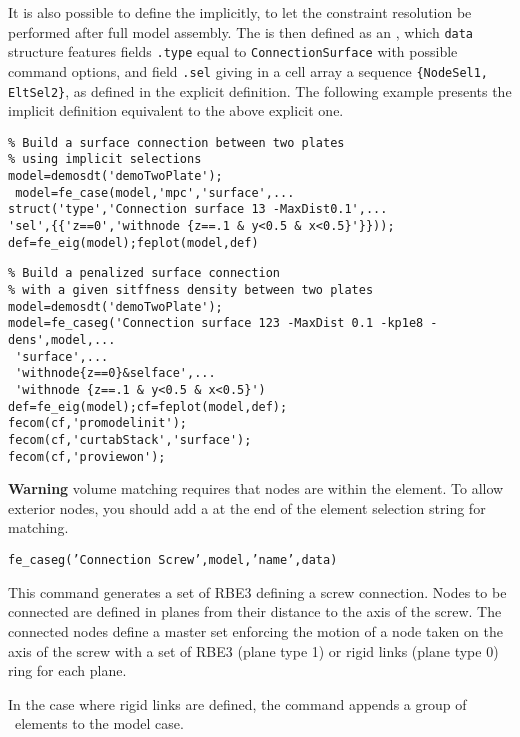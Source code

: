 \begin{SDT}
It is also possible to define the  implicitly, to let the constraint resolution be performed after full model assembly. The  is then defined as an , which {\tt data} structure features fields {\tt .type} equal to {\tt ConnectionSurface} with possible command options, and field {\tt .sel} giving in a cell array a sequence {\tt \{NodeSel1, EltSel2\}}, as defined in the explicit definition. The following example presents the implicit  definition equivalent to the above explicit one.

\begin{verbatim}
% Build a surface connection between two plates
% using implicit selections
model=demosdt('demoTwoPlate');
 model=fe_case(model,'mpc','surface',...
struct('type','Connection surface 13 -MaxDist0.1',...
'sel',{{'z==0','withnode {z==.1 & y<0.5 & x<0.5}'}}));
def=fe_eig(model);feplot(model,def)
\end{verbatim}%

\begin{verbatim}
% Build a penalized surface connection 
% with a given sitffness density between two plates
model=demosdt('demoTwoPlate');
model=fe_caseg('Connection surface 123 -MaxDist 0.1 -kp1e8 -dens',model,...
 'surface',...
 'withnode{z==0}&selface',...
 'withnode {z==.1 & y<0.5 & x<0.5}')
def=fe_eig(model);cf=feplot(model,def);
fecom(cf,'promodelinit');
fecom(cf,'curtabStack','surface');
fecom(cf,'proviewon');
\end{verbatim}%


{\bf Warning} volume matching requires that nodes are within the element. To allow exterior nodes, you should add a  at the end of the element selection string for matching.



{\tt fe\_caseg('Connection Screw',model,'name',data)}

This command generates a set of RBE3 defining a screw connection. Nodes to be connected are defined in planes from their distance to the axis of the screw. The connected nodes define a master set enforcing the motion of a node taken on the axis of the screw with a set of RBE3 (plane type 1) or rigid links (plane type 0) ring for each plane. 

In the case where rigid links are defined, the command appends a group of \rigid\ elements to the model case.


\end{SDT}

